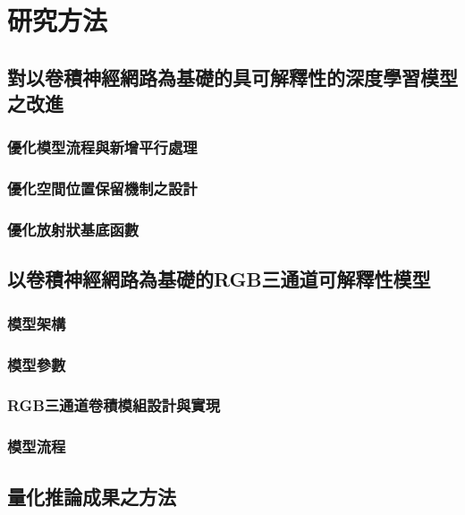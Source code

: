 \documentclass[class=NCU_thesis, crop=false]{standalone}
\begin{document}
\chapter{研究方法}
\section{對以卷積神經網路為基礎的具可解釋性的深度學習模型之改進}
\subsection{優化模型流程與新增平行處理}

\subsection{優化空間位置保留機制之設計}

\subsection{優化放射狀基底函數}




\section{以卷積神經網路為基礎的RGB三通道可解釋性模型}


\subsection{模型架構}

\subsection{模型參數}

\subsection{RGB三通道卷積模組設計與實現}

\subsection{模型流程}

\section{量化推論成果之方法}
\end{document}
